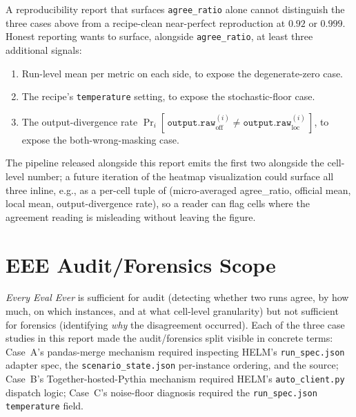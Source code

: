 \documentclass[11pt]{article}
\newcommand{\eee}{\textit{Every Eval Ever}\xspace}
\begin{document}
A reproducibility report that surfaces \texttt{agree\_ratio} alone
  cannot distinguish the three cases above from a recipe-clean
  near-perfect reproduction at $0.92$ or $0.999$.
Honest reporting wants to surface, alongside \texttt{agree\_ratio},
  at least three additional signals:

\begin{enumerate}
  \item Run-level mean per metric on each side, to expose the
        degenerate-zero case.
  \item The recipe's \texttt{temperature} setting, to expose the
        stochastic-floor case.
  \item The output-divergence rate
        $\Pr_i[\,\texttt{output.raw}_{\mathrm{off}}^{(i)} \neq
        \texttt{output.raw}_{\mathrm{loc}}^{(i)}\,]$,
        to expose the both-wrong-masking case.
\end{enumerate}

The pipeline released alongside this report emits the first two
  alongside the cell-level number; a future iteration of the heatmap
  visualization could surface all three inline, e.g., as a per-cell
  tuple of (micro-averaged agree\_ratio, official mean, local mean,
  output-divergence rate), so a reader can flag cells where the
  agreement reading is misleading without leaving the figure.


\section{EEE Audit/Forensics Scope}
\label{sec:tr-scope-split}

\eee{} is sufficient for audit (detecting whether two runs agree, by
  how much, on which instances, and at what cell-level granularity)
  but not sufficient for forensics (identifying \emph{why} the
  disagreement occurred).
Each of the three case studies in this report made the
  audit/forensics split visible in concrete terms:
  Case~A's pandas-merge mechanism required inspecting HELM's
  \texttt{run\_spec.json} adapter spec, the
  \texttt{scenario\_state.json} per-instance ordering, and the
   source;
  Case~B's Together-hosted-Pythia mechanism required HELM's
  \texttt{auto\_client.py} dispatch logic;
  Case~C's noise-floor diagnosis required the
  \texttt{run\_spec.json} \texttt{temperature} field.
\end{document}
